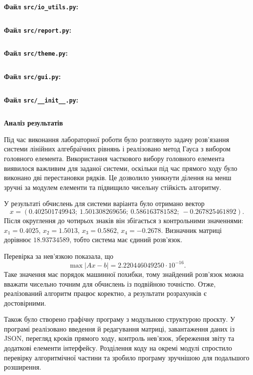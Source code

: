 \documentclass[12pt,a4paper]{article}
\begin{document}
    \noindent
    \textbf{Файл \texttt{src/io\_utils.py}:}
    \inputminted{python}{project/src/io_utils.py}

    \noindent
    \textbf{Файл \texttt{src/report.py}:}
    \inputminted{python}{project/src/report.py}

    \noindent
    \textbf{Файл \texttt{src/theme.py}:}
    \inputminted{python}{project/src/theme.py}

    \noindent
    \textbf{Файл \texttt{src/gui.py}:}
    \inputminted{python}{project/src/gui.py}

    \noindent
    \textbf{Файл \texttt{src/\_\_init\_\_.py}:}
    \inputminted{python}{project/src/__init__.py}

    \begin{center}
        \textbf{\Large Аналіз результатів}
    \end{center}

    Під час виконання лабораторної роботи було розглянуто задачу розв'язання системи лінійних
    алгебраїчних рівнянь і реалізовано метод Гауса з вибором головного елемента. Використання
    часткового вибору головного елемента виявилося важливим для заданої системи, оскільки під час
    прямого ходу було виконано дві перестановки рядків. Це дозволило уникнути ділення на менш
    зручні за модулем елементи та підвищило чисельну стійкість алгоритму.

    У результаті обчислень для системи варіанта було отримано вектор
    \[
        x=(0.402501749943;\ 1.501308269656;\ 0.586163781582;\ -0.267825461892).
    \]
    Після округлення до чотирьох знаків він збігається з контрольними значеннями:
    $x_1=0.4025$, $x_2=1.5013$, $x_3=0.5862$, $x_4=-0.2678$. Визначник матриці дорівнює
    $18.93734589$, тобто система має єдиний розв'язок.

    Перевірка за нев'язкою показала, що
    \[
        \max |Ax-b|=2.220446049250\cdot10^{-16}.
    \]
    Таке значення має порядок машинної похибки, тому знайдений розв'язок можна вважати чисельно
    точним для обчислень із подвійною точністю. Отже, реалізований алгоритм працює коректно, а
    результати розрахунків є достовірними.

    Також було створено графічну програму з модульною структурою проєкту. У програмі реалізовано
    введення й редагування матриці, завантаження даних із JSON, перегляд кроків прямого ходу,
    контроль нев'язок, збереження звіту та додаткові елементи інтерфейсу. Розділення коду на
    окремі модулі спростило перевірку алгоритмічної частини та зробило програму зручнішою для
    подальшого розширення.
\end{document}
